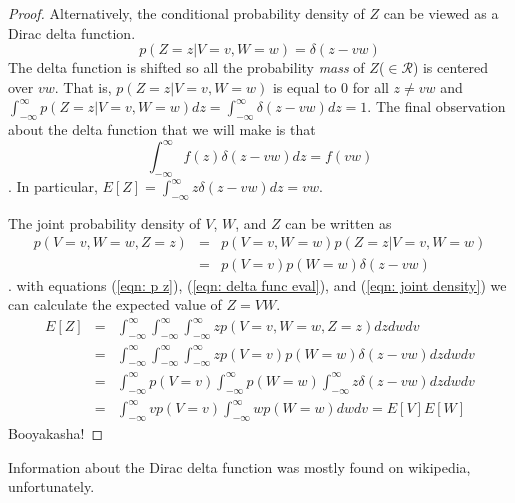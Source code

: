 \documentclass[11pt]{article}
\newcommand{\eqnref}[1]{(\ref{eqn: #1})}
\begin{document}
\begin{proof}
    {\color{blue}Alternatively}, the conditional probability density of $Z$ can be viewed as a Dirac delta function.
    \begin{equation}
        p(Z=z|V=v,W=w) = \delta(z - vw)
        \label{eqn: p z}
    \end{equation}
    The delta function is shifted so all the probability \emph{mass} of $Z$($\in \mathcal{R}$) is centered over $vw$.
    That is, $p(Z=z|V=v,W=w)$ is equal to 0 for all $z \neq vw$ and $\int_{-\infty}^{\infty}p(Z=z|V=v,W=w)dz = \int_{-\infty}^{\infty}\delta(z-vw)dz = 1$.
    The final observation about the delta function that we will make is that 
    \begin{equation}
        \int_{-\infty}^{\infty} f(z)\delta(z-vw)dz = f(vw)
        \label{eqn: delta func eval}
    \end{equation}.
    In particular, $E[Z] = \int_{-\infty}^{\infty} z\delta(z-vw)dz = vw$.
    
    The joint probability density of $V$, $W$, and $Z$ can be written as
    \begin{eqnarray}
        p(V=v, W=w, Z=z) &=& p(V=v, W=w)p(Z=z|V=v,W=w) \nonumber \\
            &=& p(V=v)p(W=w)\delta(z - vw)
            \label{eqn: joint density}
    \end{eqnarray}.
    with equations \eqnref{p z}, \eqnref{delta func eval}, and \eqnref{joint density} we can calculate the expected value of $Z=VW$.
    \begin{eqnarray}
        E[Z]
        &=& \int_{-\infty}^{\infty} \int_{-\infty}^{\infty} \int_{-\infty}^{\infty} zp(V=v,W=w,Z=z) dzdwdv \nonumber \\
        &=& \int_{-\infty}^{\infty} \int_{-\infty}^{\infty} \int_{-\infty}^{\infty} zp(V=v)p(W=w)\delta(z - vw) dzdwdv \nonumber \\
        &=& \int_{-\infty}^{\infty} p(V=v) \int_{-\infty}^{\infty} p(W=w) \int_{-\infty}^{\infty} z\delta(z - vw) dzdwdv \nonumber \\
        &=& \int_{-\infty}^{\infty} vp(V=v) \int_{-\infty}^{\infty} wp(W=w) dw dv = E[V]E[W]
        \label{eqn: z_mean}
    \end{eqnarray}
    Booyakasha!
\end{proof}
Information about the Dirac delta function was mostly found on wikipedia, unfortunately.

%
%

\end{document}
